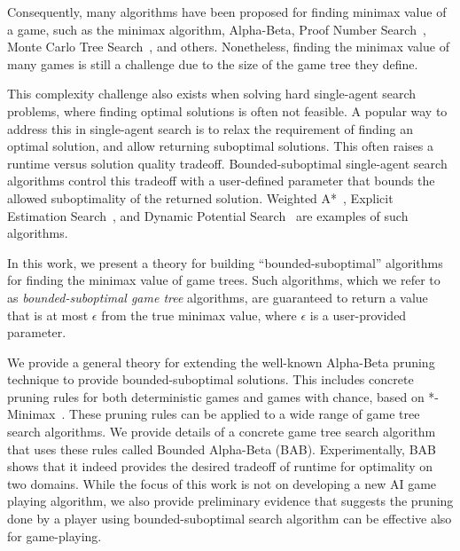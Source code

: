 \documentclass[runningheads]{llncs}
\begin{document}
Consequently, many algorithms have been proposed for finding minimax value of a game, such as the minimax algorithm, Alpha-Beta, Proof Number Search~\cite{allis1994proof}, Monte Carlo Tree Search~\cite{coulom2006efficient,kocsis2006bandit,lanctot2013monte}, and others. 
Nonetheless, finding the minimax value of many games is still a challenge due to the size of the game tree they define. 

This complexity challenge also exists when solving hard single-agent search problems, where finding optimal solutions is often not feasible. A popular way to address this in single-agent search is to relax the requirement of finding an optimal solution, and allow returning suboptimal solutions. This often raises a runtime versus solution quality tradeoff. Bounded-suboptimal single-agent search algorithms control this tradeoff with a user-defined parameter that bounds the allowed suboptimality of the returned solution. Weighted A*~\cite{pohl1970heuristic}, Explicit Estimation Search~\cite{thayer2011bounded}, and Dynamic Potential Search~\cite{gilon2016dynamic} are examples of such algorithms. 

In this work, we present a theory for building ``bounded-suboptimal'' algorithms for finding the minimax value of game trees. Such algorithms, which we refer to as \emph{bounded-suboptimal game tree} algorithms, are guaranteed to return a value that is at most $\epsilon$ from the true minimax value, where $\epsilon$ is a user-provided parameter. 


We provide a general theory for extending the well-known Alpha-Beta pruning technique to provide bounded-suboptimal solutions. This includes concrete pruning rules for both deterministic games and games with chance, based on *-Minimax~\cite{ballard1983minimax,hauk2004rediscovering}. These pruning rules can be applied to a wide range of game tree search algorithms. We provide details of a concrete game tree search algorithm that uses these rules called Bounded Alpha-Beta (BAB). Experimentally, BAB shows that it indeed provides the desired tradeoff of runtime for optimality on two domains. 
While the focus of this work is not on developing a new AI game playing algorithm, we also provide preliminary evidence that suggests the pruning done by a player using bounded-suboptimal search algorithm can be effective also for game-playing. 

\end{document}
